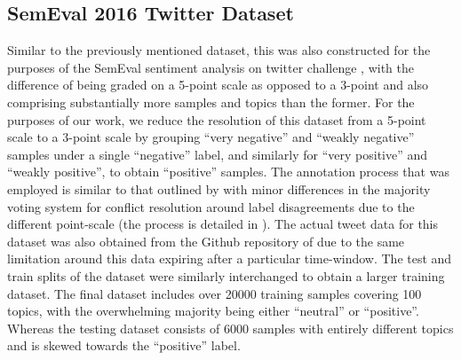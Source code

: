 \documentclass[../../fyp.tex]{subfiles}
\begin{document}
\subsection{SemEval 2016 Twitter Dataset} \label{ds:nakov}
Similar to the previously mentioned dataset, this was also constructed for the purposes of the SemEval sentiment analysis on twitter challenge \cite{nakov2016}, with the difference of being graded on a 5-point scale as opposed to a 3-point and also comprising substantially more samples and topics than the former. For the purposes of our work, we reduce the resolution of this dataset from a 5-point scale to a 3-point scale by grouping \enquote{very negative} and \enquote{weakly negative} samples under a single \enquote{negative} label, and similarly for \enquote{very positive} and \enquote{weakly positive}, to obtain \enquote{positive} samples. The annotation process that was employed is similar to that outlined by \citet{rosenthal2015} with minor differences in the majority voting system for conflict resolution around label disagreements due to the different point-scale (the process is detailed in \cite{nakov2016}). The actual tweet data for this dataset was also obtained from the Github repository of \cite{baziotis2017} due to the same limitation around this data expiring after a particular time-window. The test and train splits of the dataset were similarly interchanged to obtain a larger training dataset. The final dataset includes over 20000 training samples covering 100 topics, with the overwhelming majority being either \enquote{neutral} or \enquote{positive}. Whereas the testing dataset consists of 6000 samples with entirely different topics and is skewed towards the \enquote{positive} label.
\end{document}
